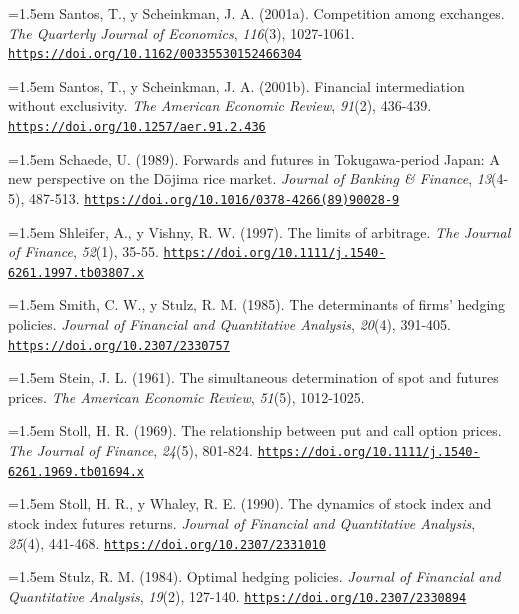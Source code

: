 \documentclass[10pt,a4paper]{article}
\begin{document}
\noindent\hangindent=1.5em Santos, T., y Scheinkman, J. A. (2001a). Competition among exchanges. \textit{The Quarterly Journal of Economics}, \textit{116}(3), 1027-1061. \href{https://doi.org/10.1162/00335530152466304}{\nolinkurl{https://doi.org/10.1162/00335530152466304}}

\noindent\hangindent=1.5em Santos, T., y Scheinkman, J. A. (2001b). Financial intermediation without exclusivity. \textit{The American Economic Review}, \textit{91}(2), 436-439. \href{https://doi.org/10.1257/aer.91.2.436}{\nolinkurl{https://doi.org/10.1257/aer.91.2.436}}

\noindent\hangindent=1.5em Schaede, U. (1989). Forwards and futures in Tokugawa-period Japan: A new perspective on the Dōjima rice market. \textit{Journal of Banking \& Finance}, \textit{13}(4-5), 487-513. \href{https://doi.org/10.1016/0378-4266(89)90028-9}{\nolinkurl{https://doi.org/10.1016/0378-4266(89)90028-9}}

\noindent\hangindent=1.5em Shleifer, A., y Vishny, R. W. (1997). The limits of arbitrage. \textit{The Journal of Finance}, \textit{52}(1), 35-55. \href{https://doi.org/10.1111/j.1540-6261.1997.tb03807.x}{\nolinkurl{https://doi.org/10.1111/j.1540-6261.1997.tb03807.x}}

\noindent\hangindent=1.5em Smith, C. W., y Stulz, R. M. (1985). The determinants of firms' hedging policies. \textit{Journal of Financial and Quantitative Analysis}, \textit{20}(4), 391-405. \href{https://doi.org/10.2307/2330757}{\nolinkurl{https://doi.org/10.2307/2330757}}

\noindent\hangindent=1.5em Stein, J. L. (1961). The simultaneous determination of spot and futures prices. \textit{The American Economic Review}, \textit{51}(5), 1012-1025.

\noindent\hangindent=1.5em Stoll, H. R. (1969). The relationship between put and call option prices. \textit{The Journal of Finance}, \textit{24}(5), 801-824. \href{https://doi.org/10.1111/j.1540-6261.1969.tb01694.x}{\nolinkurl{https://doi.org/10.1111/j.1540-6261.1969.tb01694.x}}

\noindent\hangindent=1.5em Stoll, H. R., y Whaley, R. E. (1990). The dynamics of stock index and stock index futures returns. \textit{Journal of Financial and Quantitative Analysis}, \textit{25}(4), 441-468. \href{https://doi.org/10.2307/2331010}{\nolinkurl{https://doi.org/10.2307/2331010}}

\noindent\hangindent=1.5em Stulz, R. M. (1984). Optimal hedging policies. \textit{Journal of Financial and Quantitative Analysis}, \textit{19}(2), 127-140. \href{https://doi.org/10.2307/2330894}{\nolinkurl{https://doi.org/10.2307/2330894}}
\end{document}

